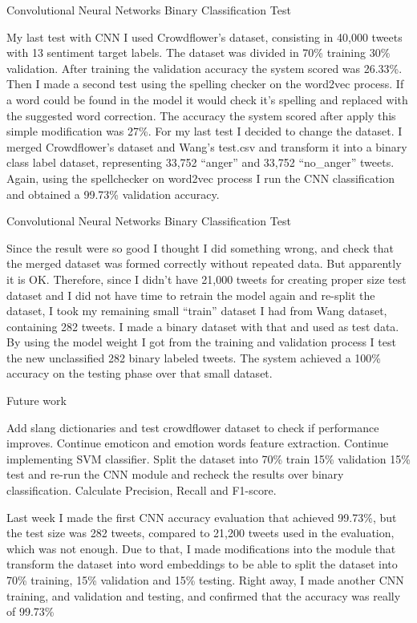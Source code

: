 Convolutional Neural Networks Binary Classification Test

My last test with CNN I used Crowdflower’s dataset, consisting in 40,000 tweets with 13 sentiment target labels. The dataset was divided in 70\% training 30\% validation. After training the validation accuracy the system scored was 26.33\%. Then I made a second test using the spelling checker on the word2vec process. If a word could be found in the model it would check it’s spelling and replaced with the suggested word correction. The accuracy the system scored after apply this simple modification was 27\%. For my last test I decided to change the dataset. I merged Crowdflower’s dataset and Wang’s test.csv and transform it into a binary class label dataset, representing 33,752 “anger” and 33,752 “no\_anger” tweets. Again, using the spellchecker on word2vec process I run the CNN classification and obtained a 99.73\% validation accuracy.

Convolutional Neural Networks Binary Classification Test

Since the result were so good I thought I did something wrong, and check that the merged dataset was formed correctly without repeated data. But apparently it is OK. Therefore, since I didn’t have 21,000 tweets for creating proper size test dataset and I did not have time to retrain the model again and re-split the dataset, I took my remaining small “train” dataset I had from Wang dataset, containing 282 tweets. I made a binary dataset with that and used as test data. By using the model weight I got from the training and validation process I test the new unclassified 282 binary labeled tweets. The system achieved a 100\% accuracy on the testing phase over that small dataset.

Future work

Add slang dictionaries and test crowdflower dataset to check if performance improves.
Continue emoticon and emotion words feature extraction.
Continue implementing SVM classifier.
Split the dataset into 70\% train 15\% validation 15\% test and re-run the CNN module and recheck the results over binary classification.
Calculate Precision, Recall and F1-score.

Last week I made the first CNN accuracy evaluation that achieved 99.73\%, but the test size was 282 tweets, compared to 21,200 tweets used in the evaluation, which was not enough.
Due to that, I made modifications into the module that transform the dataset into word embeddings to be able to split the dataset into 70\% training, 15\% validation and 15\% testing.
Right away, I made another CNN training, and validation and testing, and confirmed that the accuracy was really of 99.73\%

